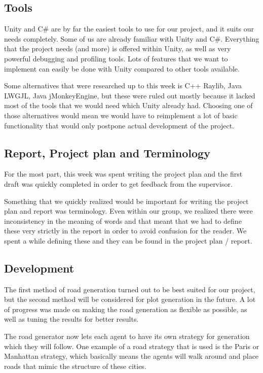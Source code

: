 \documentclass[11pt]{article}
\begin{document}
\subsection*{Tools}
\label{sec:org7d31507}
Unity and C\# are by far the easiest tools to use for our project, and it suits
our needs completely. Some of us are already familiar with Unity and C\#.
Everything that the project needs (and more) is offered within Unity, as well as
very powerful debugging and profiling tools. Lots of features that we want to
implement can easily be done with Unity compared to other tools available.

Some alternatives that were researched up to this week is C++ Raylib, Java
LWGJL, Java jMonkeyEngine, but these were ruled out mostly because it lacked
most of the tools that we would need which Unity already had.
Choosing one of those alternatives would mean we would have to reimplement a lot
of basic functionality that would only postpone actual development of the
project.

\subsection*{Report, Project plan and Terminology}
\label{sec:orge7960d9}
For the most part, this week was spent writing the project plan and the first
draft was quickly completed in order to get feedback from the supervisor.

Something that we quickly realized would be important for writing the project
plan and report was terminology.
Even within our group, we realized there were inconsistency in the meaning of
words and that meant that we had to define these very strictly in the report in
order to avoid confusion for the reader. We spent a while defining these and
they can be found in the project plan / report.

\subsection*{Development}
\label{sec:orgac1204f}
The first method of road generation turned out to be best suited for our
project, but the second method will be considered for plot generation in the
future.
A lot of progress was made on making the road generation as flexible as
possible, as well as tuning the results for better results.

The road generator now lets each agent to have its own strategy for generation
which they will follow. One example of a road strategy that is used is the Paris
or Manhattan strategy, which basically means the agents will walk around and
place roads that mimic the structure of these cities.
\end{document}
